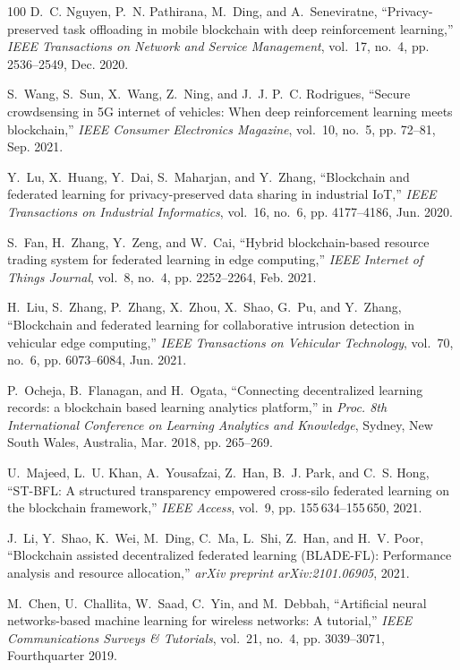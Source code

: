 \documentclass[journal]{IEEEtran}
\begin{document}
\begin{thebibliography}{100}
	D.~C. Nguyen, P.~N. Pathirana, M.~Ding, and A.~Seneviratne, ``Privacy-preserved
	task offloading in mobile blockchain with deep reinforcement learning,''
	\emph{IEEE Transactions on Network and Service Management}, vol.~17, no.~4,
	pp. 2536--2549, Dec. 2020.
	
	S.~Wang, S.~Sun, X.~Wang, Z.~Ning, and J.~J. P.~C. Rodrigues, ``Secure
	crowdsensing in {5G} internet of vehicles: When deep reinforcement learning
	meets blockchain,'' \emph{IEEE Consumer Electronics Magazine}, vol.~10,
	no.~5, pp. 72--81, Sep. 2021.
	
	Y.~Lu, X.~Huang, Y.~Dai, S.~Maharjan, and Y.~Zhang, ``Blockchain and federated
	learning for privacy-preserved data sharing in industrial {IoT},'' \emph{IEEE
		Transactions on Industrial Informatics}, vol.~16, no.~6, pp. 4177--4186, Jun.
	2020.
	
	S.~Fan, H.~Zhang, Y.~Zeng, and W.~Cai, ``Hybrid blockchain-based resource
	trading system for federated learning in edge computing,'' \emph{IEEE
		Internet of Things Journal}, vol.~8, no.~4, pp. 2252--2264, Feb. 2021.
	
	H.~Liu, S.~Zhang, P.~Zhang, X.~Zhou, X.~Shao, G.~Pu, and Y.~Zhang, ``Blockchain
	and federated learning for collaborative intrusion detection in vehicular
	edge computing,'' \emph{IEEE Transactions on Vehicular Technology}, vol.~70,
	no.~6, pp. 6073--6084, Jun. 2021.
	
	P.~Ocheja, B.~Flanagan, and H.~Ogata, ``Connecting decentralized learning
	records: a blockchain based learning analytics platform,'' in \emph{Proc. 8th
		International Conference on Learning Analytics and Knowledge}, Sydney, New
	South Wales, Australia, Mar. 2018, pp. 265--269.
	
	U.~Majeed, L.~U. Khan, A.~Yousafzai, Z.~Han, B.~J. Park, and C.~S. Hong,
	``{ST-BFL}: A structured transparency empowered cross-silo federated learning
	on the blockchain framework,'' \emph{IEEE Access}, vol.~9, pp.
	155\,634--155\,650, 2021.
	
	J.~Li, Y.~Shao, K.~Wei, M.~Ding, C.~Ma, L.~Shi, Z.~Han, and H.~V. Poor,
	``Blockchain assisted decentralized federated learning {(BLADE-FL)}:
	Performance analysis and resource allocation,'' \emph{arXiv preprint
		arXiv:2101.06905}, 2021.
	
	M.~Chen, U.~Challita, W.~Saad, C.~Yin, and M.~Debbah, ``Artificial neural
	networks-based machine learning for wireless networks: A tutorial,''
	\emph{IEEE Communications Surveys \& Tutorials}, vol.~21, no.~4, pp.
	3039--3071, {Fourthquarter} 2019.
	

\end{thebibliography}
\end{document}
